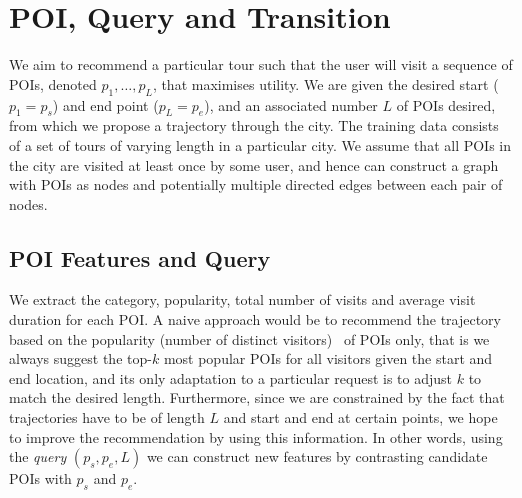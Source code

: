 \section{POI, Query and Transition}
\label{sec:method}


We aim to recommend a particular tour such that the user will visit a sequence of POIs, denoted $p_1, \ldots, p_L$, that maximises utility. We are given the desired start ($p_1=p_s$) and end point ($p_L=p_e$), and an associated number $L$ of POIs desired, from which we propose a trajectory through the city.
%
%
The training data consists of a set of tours of varying length in a particular city. We assume that all POIs %
in the city are visited at least once by some user, and hence can construct a graph with POIs as nodes and potentially multiple directed edges between each pair of nodes. 



\subsection{POI Features and Query}
\label{sec:poifeature}

We extract the category, popularity, total number of visits and average visit duration for each POI.
A naive approach would be to recommend the trajectory based on the popularity (number of distinct visitors)~\cite{ht10} of POIs only,
that is we always suggest the top-$k$ most popular POIs for all visitors given the start and end location, 
and its only adaptation to a particular request is to adjust $k$ to match the desired length.
Furthermore, since we are constrained by the fact that trajectories have to be of length $L$ and start and end at certain points, we hope to improve the recommendation by using this information.
In other words, using the \textit{query} $(p_s, p_e, L)$ we can construct new features by contrasting candidate POIs with $p_s$ and $p_e$.

